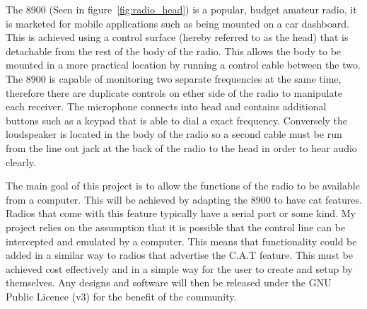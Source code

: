 The \gls{8900} (Seen in figure~\ref{fig:radio_head}) is a popular, budget amateur radio, it is marketed for mobile applications such as being mounted on a car dashboard. This is achieved using a control surface (hereby referred to as the head) that is detachable from the rest of the body of the radio. This allows the body to be mounted in a more practical location by running a control cable between the two. The \gls{8900} is capable of monitoring two separate frequencies at the same time, therefore there are duplicate controls on ether side of the radio to manipulate each receiver. The microphone connects into head and contains additional buttons such as a keypad that is able to dial a exact frequency. Conversely the loudspeaker is located in the body of the radio so a second cable must be run from the line out jack at the back of the radio to the head in order to hear audio clearly.

The main goal of this project is to allow the functions of the radio to be available from a computer. This will be achieved by adapting the \gls{8900} to have \gls{cat} features. Radios that come with this feature typically have a serial port or some kind. My project relies on the assumption that it is possible that the control line can be intercepted and emulated by a computer. This means that functionality could be added in a similar way to radios that advertise the C.A.T feature. This must be achieved cost effectively and in a simple way for the user to create and setup by themselves. Any designs and software will then be released under the GNU Public Licence (v3) for the benefit of the community.